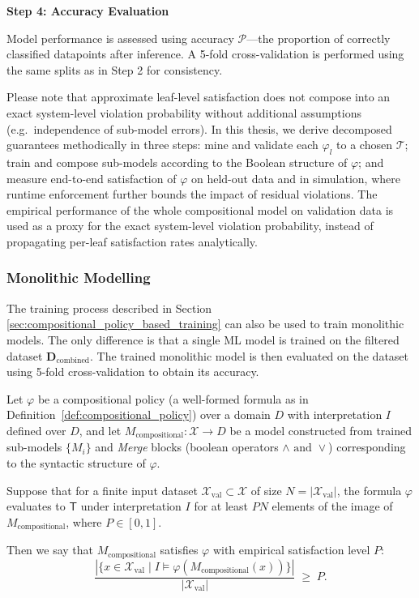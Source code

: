 \textbf{Step 4: Accuracy Evaluation}

Model performance is assessed using accuracy $\mathcal{P}$—the proportion of correctly classified datapoints after inference. A 5-fold cross-validation is performed using the same splits as in Step 2 for consistency.


Please note that approximate leaf-level satisfaction does not compose into an exact system-level violation probability without additional assumptions (e.g.\ independence of sub-model errors). In this thesis, we derive decomposed guarantees methodically in three steps: mine and validate each $\varphi_l$ to a chosen $\mathcal{T}$; train and compose sub-models according to the Boolean structure of $\varphi$; and measure end-to-end satisfaction of $\varphi$ on held-out data and in simulation, where runtime enforcement further bounds the impact of residual violations. The empirical performance of the whole compositional model on validation data is used as a proxy for the exact system-level violation probability, instead of propagating per-leaf satisfaction rates analytically.



\subsubsection{Monolithic Modelling}
The training process described in Section \ref{sec:compositional_policy_based_training} can also be used to train monolithic models. The only difference is that a single ML model is trained on the filtered dataset  $\mathcal{\mathbf{D}}_{\text{combined}}$. The trained monolithic model is then evaluated on the dataset using 5-fold cross-validation to obtain its accuracy.


\begin{proposition}
Let $\varphi$ be a compositional policy (a well-formed formula as in Definition~\ref{def:compositional_policy}) over a domain $D$ with interpretation $I$ defined over $D$, and let $M_{\text{compositional}} : \mathcal{X} \rightarrow D$ be a model constructed from trained sub-models $\{M_i\}$ and \textit{Merge} blocks (boolean operators $\land \text{ and } \lor$) corresponding to the syntactic structure of $\varphi$.

Suppose that for a finite input dataset $\mathcal{X}_{\text{val}} \subset \mathcal{X}$ of size $N = |\mathcal{X}_{\text{val}}|$, the formula $\varphi$ evaluates to $\mathsf{T}$ under interpretation $I$ for at least $PN$ elements of the image of $M_{\text{compositional}}$, where \( P \in [0,1] \).

Then we say that $M_{\text{compositional}}$ satisfies $\varphi$ with empirical satisfaction level $P$:
\[
\frac{|\{x \in \mathcal{X}_{\text{val}} \mid I \models \varphi(M_{\text{compositional}}(x)) \}|}{|\mathcal{X}_{\text{val}}|} \;\geq\; P.
\]
\label{proposition_compositional_policy_satisfaction}
\end{proposition}

